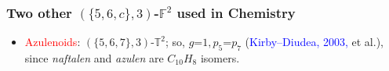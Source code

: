 \documentclass{beamer}
\begin{document}
\begin{frame}
\begin{itemize}
 
\end{itemize}
\end{frame}














 
\begin{frame}\frametitle{Two other 
$(\{5,6,c\},3)$-$\mathbb{F}^2$ used in Chemistry}
\vspace{-2mm}

\begin{itemize}


\item \textcolor{red}{Azulenoids}: $(\{5,6,7\},3)$-$\mathbb{T}^2$; so, 
$g$=$1,p_5$=$p_7$ (\textcolor{blue}{Kirby--Diudea, 2003,} et al.), since {\em naftalen} and {\em azulen} 
are  $C_{10}H_{8}$ isomers.
\vspace{-10mm}
\hspace{-8mm}
\begin{center}\hspace{-8mm}
\end{center}
\vspace{-28mm}


\begin{center}
\begin{minipage}[b]{3.8cm}\centering
{}
\end{minipage}
\hspace{0.1cm}
\begin{minipage}[b]{4.0cm}\centering
{}
\end{minipage}\end{center}
\vspace{-3mm}





\end{itemize}
\end{frame}
\end{document}
